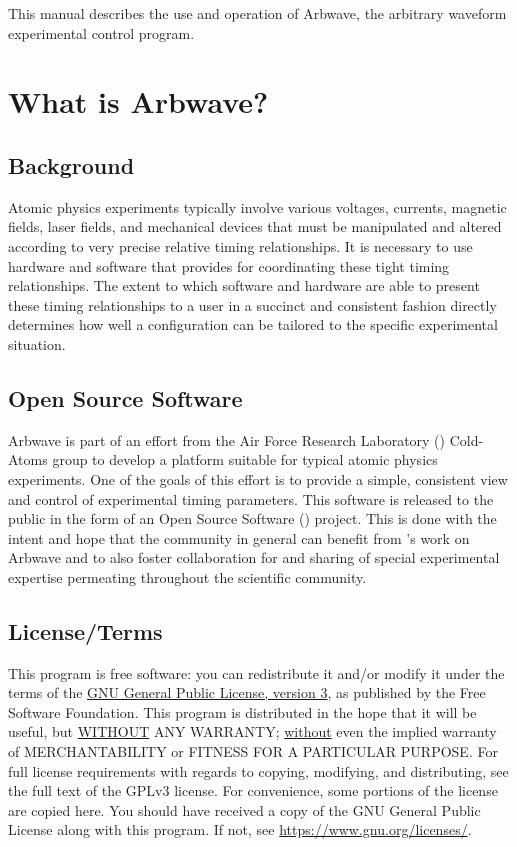 \thispagestyle{fancy}
\pagestyle{fancy}

This manual describes the use and operation of Arbwave, the arbitrary waveform
experimental control program.

\section{What is Arbwave?}
\subsection{Background}
Atomic physics experiments typically involve various voltages, currents,
magnetic fields, laser fields, and mechanical devices that must be manipulated
and altered according to very precise relative timing relationships.  It is
necessary to use hardware and software that provides for coordinating these
tight timing relationships.  The extent to which software and hardware are
able to present these timing relationships to a user in a succinct and
consistent fashion directly determines how well a configuration can be
tailored to the specific experimental situation.

\subsection{Open Source Software}
Arbwave is part of an effort from the Air Force Research Laboratory
() Cold-Atoms group to develop a platform suitable for typical atomic
physics experiments.  One of the goals of this effort is to provide a simple,
consistent view and control of experimental timing parameters.  This software is
released to the public in the form of an Open Source Software ()
project.  This is done with the intent and hope that the community in general
can benefit from 's work on Arbwave and to also foster collaboration
for and sharing of special experimental expertise permeating throughout the
scientific community.

\subsection{License/Terms}
This program is free software: you can redistribute it and/or modify it under
the terms of the
\href{https://www.gnu.org/licenses/gpl-3.0.en.html}
{GNU General Public License, version 3}, as published by the Free
Software Foundation.  This program is distributed in the hope that it will be
useful, but \underline{WITHOUT} ANY WARRANTY; \underline{without} even the
implied warranty of MERCHANTABILITY or FITNESS FOR A PARTICULAR PURPOSE.  For
full license requirements with regards to copying, modifying, and distributing,
see the full text of the GPLv3 license.  For convenience, some portions of the
license are copied here.  You should have received a copy of the GNU General
Public License along with this program.  If not, see
\url{https://www.gnu.org/licenses/}.


